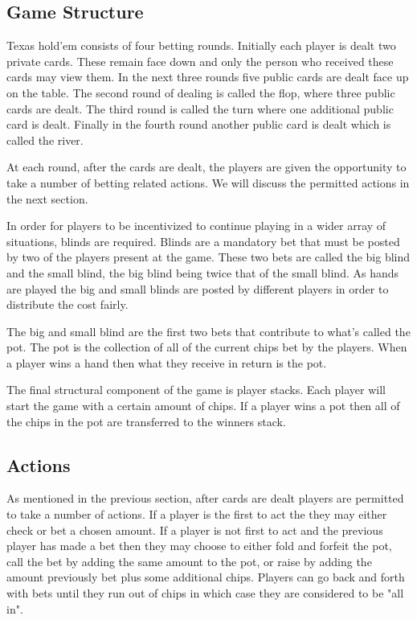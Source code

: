 \subsection{Game Structure}\label{subsec:bettingRounds}
Texas hold'em consists of four betting rounds.
Initially each player is dealt two private cards.
These remain face down and only the person who received these cards may view them.
In the next three rounds five public cards are dealt face up on the table.
The second round of dealing is called the flop, where three public cards are dealt.
The third round is called the turn where one additional public card is dealt.
Finally in the fourth round another public card is dealt which is called the river.

At each round, after the cards are dealt, the players are given the opportunity to take a number of betting
related actions.
We will discuss the permitted actions in the next section.

In order for players to be incentivized to continue playing in a wider array of situations, blinds are required.
Blinds are a mandatory bet that must be posted by two of the players present at the game.
These two bets are called the big blind and the small blind, the big blind being twice that of the small blind.
As hands are played the big and small blinds are posted by different players in order to distribute the cost fairly.

The big and small blind are the first two bets that contribute to what's called the pot.
The pot is the collection of all of the current chips bet by the players.
When a player wins a hand then what they receive in return is the pot.

The final structural component of the game is player stacks.
Each player will start the game with a certain amount of chips.
If a player wins a pot then all of the chips in the pot are transferred to the winners stack.

\subsection{Actions}\label{subsec:actions}
As mentioned in the previous section, after cards are dealt players are permitted to take a number of actions.
If a player is the first to act the they may either check or bet a chosen amount.
If a player is not first to act and the previous player has made a bet then they may choose
to either fold and forfeit the pot, call the bet by adding the same amount to the pot, or raise by
adding the amount previously bet plus some additional chips.
Players can go back and forth with bets until they run out of chips in which case they are
considered to be "all in".

